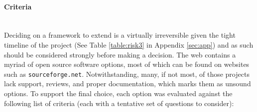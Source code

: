 \documentclass[12pt]{article}
\begin{document}
			\paragraph{Criteria}\hfill\\
				Deciding on a framework to extend is a virtually irreversible given the tight timeline of the project (See Table \ref{table:risk3} in Appendix \ref{sec:app}) and as such should be considered strongly before making a decision. The web contains a myriad of open source software options, most of which can be found on websites such as \texttt{sourceforge.net}. Notwithstanding, many, if not most, of those projects lack support, reviews, and proper documentation, which marks them as unsound options. To support the final choice, each option was evaluated against the following list of criteria (each with a tentative set of questions to consider):
\end{document}
